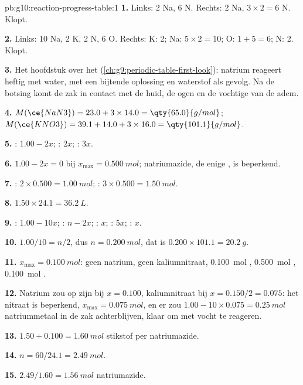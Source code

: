 \begin{solution}{pb:g10:reaction-progress-table:1}
\textbf{1.} Links: 2 Na, 6 N. Rechts: 2 Na, $3 \times 2 = 6$ N. Klopt.

\textbf{2.} Links: 10 Na, 2 K, 2 N, 6 O. Rechts: K: 2; Na: $5 \times 2 =
10$; O: $1 + 5 = 6$; N: 2. Klopt.

\textbf{3.} Het hoofdstuk over het 
(\cref{ch:g9:periodic-table-first-look}): natrium reageert heftig met
water, met een bijtende oplossing en waterstof als gevolg. Na de botsing
komt de zak in contact met de huid, de ogen en de vochtige  van de
adem.

\textbf{4.} $M(\ce{NaN3}) = 23.0 + 3 \times 14.0 = \qty{65.0}{g/mol}$;
$M(\ce{KNO3}) = 39.1 + 14.0 + 3 \times 16.0 = \qty{101.1}{g/mol}$.

\textbf{5.} : $1.00 - 2x$; : $2x$; : $3x$.

\textbf{6.} $1.00 - 2x = 0$ bij $x_{\max} = \qty{0.500}{mol}$;
natriumazide, de enige , is beperkend.

\textbf{7.} : $2 \times 0.500 = \qty{1.00}{mol}$; :
$3 \times 0.500 = \qty{1.50}{mol}$.

\textbf{8.} $1.50 \times 24.1 = \qty{36.2}{L}$.

\textbf{9.} : $1.00 - 10x$; : $n - 2x$; : $x$;
: $5x$; : $x$.

\textbf{10.} $1.00/10 = n/2$, dus $n = \qty{0.200}{mol}$, dat is
$0.200 \times 101.1 = \qty{20.2}{g}$.

\textbf{11.} $x_{\max} = \qty{0.100}{mol}$: geen natrium, geen
kaliumnitraat, \qty{0.100}{mol} , \qty{0.500}{mol} ,
\qty{0.100}{mol} .

\textbf{12.} Natrium zou op zijn bij $x = 0.100$, kaliumnitraat bij
$x = 0.150/2 = 0.075$: het nitraat is beperkend, $x_{\max} =
\qty{0.075}{mol}$, en er zou $1.00 - 10 \times 0.075 = \qty{0.25}{mol}$
natriummetaal in de zak achterblijven, klaar om met vocht te reageren.

\textbf{13.} $1.50 + 0.100 = \qty{1.60}{mol}$ stikstof per 
natriumazide.

\textbf{14.} $n = 60 / 24.1 = \qty{2.49}{mol}$.

\textbf{15.} $2.49 / 1.60 = \qty{1.56}{mol}$ natriumazide.


\end{solution}
